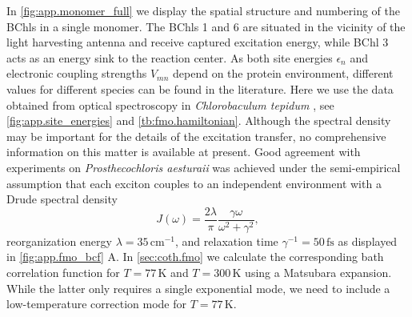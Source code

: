 In \autoref{fig:app.monomer_full} we display the spatial structure and numbering of the BChls in a single monomer.
The BChls 1 and 6 are situated in the vicinity of the light harvesting antenna and receive captured excitation energy, while BChl 3 acts as an energy sink to the reaction center.
As both site energies $\epsilon_n$ and electronic coupling strengths $V_{mn}$ depend on the protein environment, different values for different species can be found in the literature.
Here we use the data obtained from optical spectroscopy in \emph{Chlorobaculum tepidum} \cite{AdRe06_fmo}, see \autoref{fig:app.site_energies} and \autoref{tb:fmo.hamiltonian}.
Although the spectral density may be important for the details of the excitation transfer, no comprehensive information on this matter is available at present.
Good agreement with experiments on \emph{Prosthecochloris aesturaii} was achieved \cite{ReScEn08_fmo_spectral_density} under the semi-empirical assumption that each exciton couples to an independent environment with a Drude spectral density
\begin{equation}
  J(\omega) = \frac{2 \lambda}{\pi} \frac{\gamma\omega}{\omega^2 + \gamma^2},
  \label{eq:app.drude}
\end{equation}
reorganization energy $\lambda = 35\,\mathrm{cm^{-1}}$, and relaxation time $\gamma^{-1} = 50\,\mathrm{fs}$ as displayed in \autoref{fig:app.fmo_bcf} A.
In \autoref{sec:coth.fmo} we calculate the corresponding bath correlation function for $T=77\,\mathrm{K}$ and $T=300\,\mathrm{K}$ using a Matsubara expansion.
While the latter only requires a single exponential mode, we need to include a low-temperature correction mode for $T=77\,\mathrm{K}$.\\



